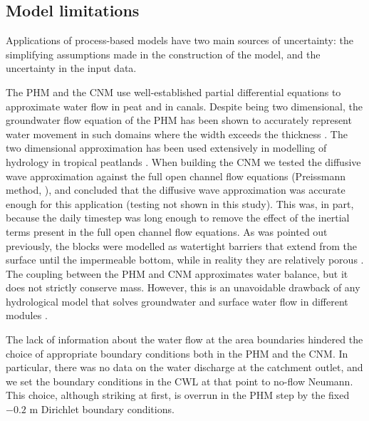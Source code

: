 \documentclass[bg, manuscript]{copernicus}
\begin{document}
\subsection{Model limitations}

Applications of process-based models have two main sources of uncertainty: the simplifying assumptions made in the construction of the model, and the uncertainty in the input data.

The PHM and the CNM use well-established partial differential equations to approximate water flow in peat and in canals.
Despite being two dimensional, the groundwater flow equation of the PHM has been shown to accurately represent water movement in such domains where the width exceeds the thickness \citep{connortonDoesRegionalGroundwaterflow1985}.
The two dimensional approximation has been used extensively in modelling of hydrology in tropical peatlands \citep{bairdDigiBogPeatlandDevelopment2012, cobbHowTemporalPatterns2017}.
When building the CNM we tested the diffusive wave approximation against the full open channel flow equations (Preissmann method, \cite{cungePracticalAspectsComputational1980, haahtiUnsteadyFlowSimulation2014}), and concluded that the diffusive wave approximation was accurate enough for this application (testing not shown in this study). 
This was, in part, because the daily timestep was long enough to remove the effect of the inertial terms present in the full open channel flow equations.
As was pointed out previously, the blocks were modelled as watertight barriers that extend from the surface until the impermeable bottom, while in reality they are relatively porous \citep{osakiTropicalPeatlandEcosystems2016, ritzemaCanalBlockingStrategies2014}.
The coupling between the PHM and CNM approximates water balance, but it does not strictly conserve mass.
However, this is an unavoidable drawback of any hydrological model that solves groundwater and surface water flow in different modules \citep{barthelGroundwaterSurfaceWater2016}. 

The lack of information about the water flow at the area boundaries hindered the choice of appropriate boundary conditions both in the PHM and the CNM.
In particular, there was no data on the water discharge at the catchment outlet, and we set the boundary conditions in the CWL at that point to no-flow Neumann.
This choice, although striking at first, is overrun in the PHM step by the fixed $-0.2$ \unit{m} Dirichlet boundary conditions.
\end{document}
